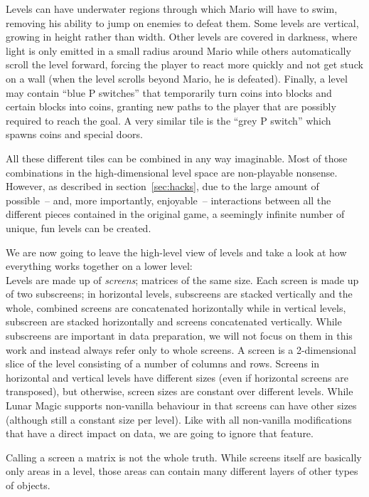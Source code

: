 Levels can have underwater regions through which Mario will have to
swim, removing his ability to jump on enemies to defeat them. Some
levels are vertical, growing in height rather than width. Other levels
are covered in darkness, where light is only emitted in a small radius
around Mario while others automatically scroll the level forward,
forcing the player to react more quickly and not get stuck on a wall
(when the level scrolls beyond Mario, he is defeated). Finally, a
level may contain ``blue P switches'' that temporarily turn coins into
blocks and certain blocks into coins, granting new paths to the player
that are possibly required to reach the goal. A very similar tile is
the ``grey P switch'' which spawns coins and special doors.

All these different tiles can be combined in any way imaginable. Most
of those combinations in the high-dimensional level space are
non-playable nonsense. However, as described in
section~\ref{sec:hacks}, due to the large amount of possible~-- and,
more importantly, enjoyable~-- interactions between all the different
pieces contained in the original game, a seemingly infinite number of
unique, fun levels can be created.
\medskip

We are now going to leave the high-level view of levels and take a
look at how everything works together on a lower level: \\
Levels are made up of \emph{screens}; matrices of the same size. Each
screen is made up of two subscreens; in horizontal levels, subscreens
are stacked vertically and the whole, combined screens are
concatenated horizontally while in vertical levels, subscreen are
stacked horizontally and screens concatenated vertically. While
subscreens are important in data preparation, we will not focus on
them in this work and instead always refer only to whole screens. A
screen is a 2-dimensional slice of the level consisting of a number of
columns and rows. Screens in horizontal and vertical levels have
different sizes (even if horizontal screens are transposed), but
otherwise, screen sizes are constant over different levels. While
Lunar Magic supports non-vanilla behaviour in that screens can have
other sizes (although still a constant size per level). Like with all
non-vanilla modifications that have a direct impact on data, we are
going to ignore that feature.

Calling a screen a matrix is not the whole truth. While screens itself
are basically only areas in a level, those areas can contain many
different layers of other types of objects.

